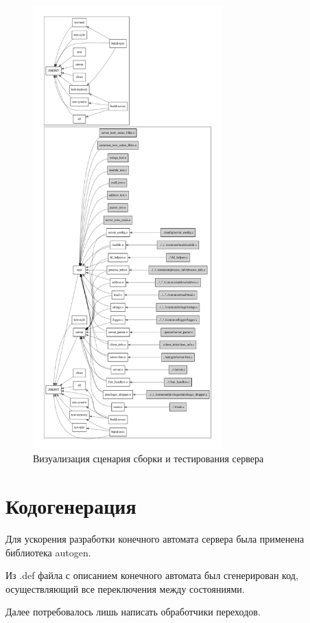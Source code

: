 \documentclass[a4paper,12pt]{report}
\begin{document}
\begin{figure}[H]
	\centering
	\includegraphics[width=0.65\textwidth]{include/server_make.pdf}
	\caption{Визуализация сценария сборки и тестирования сервера}
	\label{fig:make1}
\end{figure}

\section{Кодогенерация}
Для ускорения разработки конечного автомата сервера была применена библиотека autogen. 

Из .def файла с описанием конечного автомата был сгенерирован код, осуществляющий все переключения между состояниями. 

Далее потребовалось лишь написать обработчики переходов. 
\end{document}
